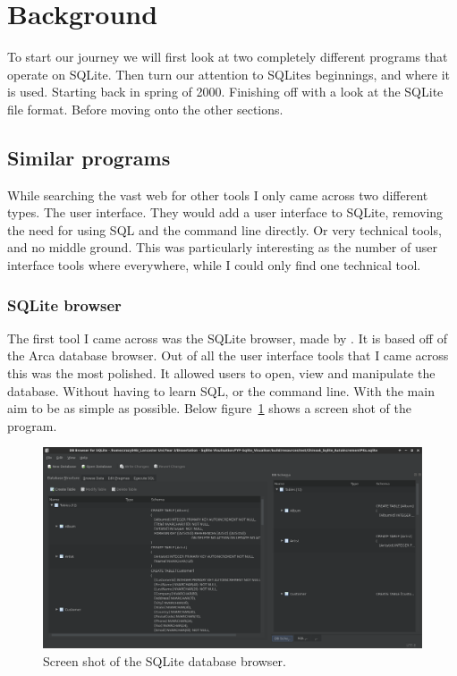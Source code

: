 \section{Background}
\label{sec:sqlite_intro}

To start our journey we will first look at two completely different programs that operate on SQLite. Then turn our attention to SQLites beginnings, and where it is used. Starting back in spring of 2000. Finishing off with a look at the SQLite file format. Before moving onto the other sections.

\subsection{Similar programs}
\label{subsec:similar_programs}

While searching the vast web for other tools I only came across two different types. The user interface. They would add a user interface to SQLite, removing the need for using SQL and the command line directly. Or very technical tools, and no middle ground. This was particularly interesting as the number of user interface tools where everywhere, while I could only find one technical tool. 

\subsubsection{SQLite browser}
\label{subsubsec:sqlite_browser}

The first tool I came across was the SQLite browser, made by \cite{sqlitebrowser}. It is based off of the Arca database browser. Out of all the user interface tools that I came across this was the most polished. It allowed users to open, view and manipulate the database. Without having to learn SQL, or the command line. With the main aim to be as simple as possible. Below figure~\ref{fig:db_browser_screen} shows a screen shot of the program.

\begin{figure}[H]
	\centering
	\includegraphics[scale=0.25]{images/db_browser.png}
	\caption{Screen shot of the SQLite database browser.}
	\label{fig:db_browser_screen}
\end{figure}

